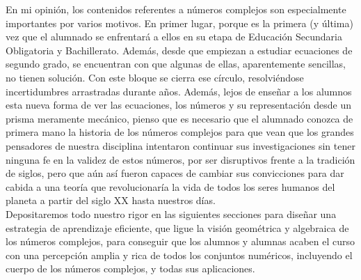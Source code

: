 \documentclass[../main.tex]{memoir}
\begin{document}
En mi opinión, los contenidos referentes a números complejos son especialmente importantes por varios motivos. En primer lugar, porque es la primera (y última) vez que el alumnado se enfrentará a ellos en su etapa de Educación Secundaria Obligatoria y Bachillerato. Además, desde que empiezan a estudiar ecuaciones de segundo grado, se encuentran con que algunas de ellas, aparentemente sencillas, no tienen solución. Con este bloque se cierra ese círculo, resolviéndose incertidumbres arrastradas durante años. Además, lejos de enseñar a los alumnos esta nueva forma de ver las ecuaciones, los números y su representación desde un prisma meramente mecánico, pienso que es necesario que el alumnado conozca de primera mano la historia de los números complejos para que vean que los grandes pensadores de nuestra disciplina intentaron continuar sus investigaciones sin tener ninguna fe en la validez de estos números, por ser disruptivos frente a la tradición de siglos, pero que aún así fueron capaces de cambiar sus convicciones para dar cabida a una teoría que revolucionaría la vida de todos los seres humanos del planeta a partir del siglo XX hasta nuestros días.\\


Depositaremos todo nuestro rigor en las siguientes secciones para diseñar una estrategia de aprendizaje eficiente, que ligue la visión geométrica y algebraica de los números complejos, para conseguir que los alumnos y alumnas acaben el curso con una percepción amplia y rica de todos los conjuntos numéricos, incluyendo el cuerpo de los números complejos, y todas sus aplicaciones.
\end{document}
